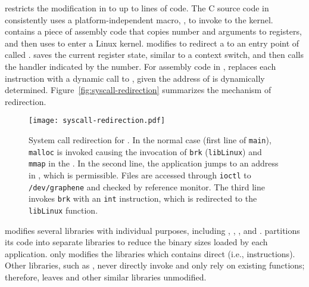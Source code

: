 \graphene{} restricts the modification in \glibc{}
to up to \gipclines{} lines of code.
The C source code in \glibc{} consistently uses a platform-independent macro,
,
to invoke \linuxapis{} to the kernel.
 contains a piece of assembly code
that copies \linuxapi{} number and arguments to registers,
and then uses  to enter a Linux kernel.
\graphene{} modifies 
to redirect a \linuxapi{} to
an entry point of \thelibos{} called .
 saves the current register state, similar to a context switch,
and then
calls the \linuxapi{} handler
indicated by the \linuxapi{} number.
For assembly code in \glibc{},
\graphene{} replaces each  instruction with
a dynamic call to
, given the address of  is dynamically determined.
Figure~\ref{fig:syscall-redirection} summarizes the mechanism of \linuxapi{} redirection.


\begin{figure}[t!]
\centering
\texttt{[image: syscall-redirection.pdf]}
\footnotesize
\caption{System call redirection for \thelibos{}.
In the normal case (first line of {\tt main}), {\tt malloc} is invoked causing the invocation of {\tt brk} ({\tt libLinux}) and {\tt mmap} in the \pal{}. In the second line, the application jumps to an address in \pal{}, which is permissible.
Files are accessed through {\tt ioctl} to {\tt /dev/graphene} and checked by reference monitor.
The third line invokes {\tt brk} with an {\tt int} instruction, which is redirected to the {\tt libLinux} function.}
\label{fig:libos:syscall-redirection}
\end{figure}


\graphene{} modifies several \glibc{} libraries with individual purposes,
including , , \libpthread{}, and \libdl{}.
\Glibc{} partitions its code into separate libraries to reduce the binary sizes
loaded by each application.
\graphene{} only modifies the libraries which contains direct \linuxapis{} (i.e.,  instructions).
Other \libc{} libraries, such as ,
never directly invoke \linuxapis{} and only rely on 
existing \libc{} functions;
therefore, \graphene{} leaves  and other similar \libc{} libraries unmodified.



